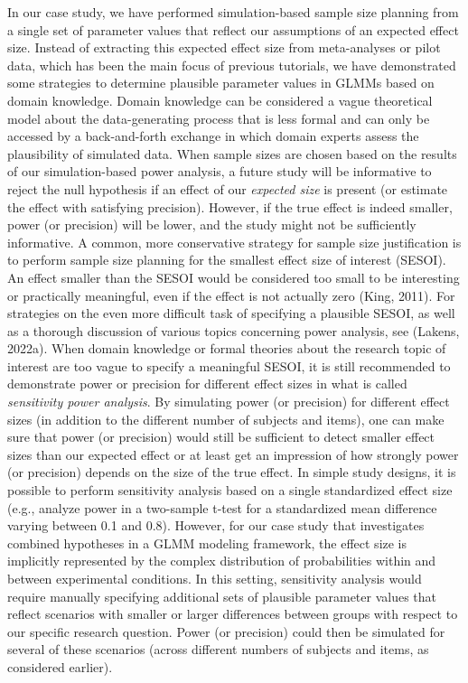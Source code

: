 \documentclass[
  man,floatsintext]{apa6}
\begin{document}
In our case study, we have performed simulation-based sample size planning from a single set of parameter values that reflect our assumptions of an expected effect size. Instead of extracting this expected effect size from meta-analyses or pilot data, which has been the main focus of previous tutorials, we have demonstrated some strategies to determine plausible parameter values in GLMMs based on domain knowledge. Domain knowledge can be considered a vague theoretical model about the data-generating process that is less formal and can only be accessed by a back-and-forth exchange in which domain experts assess the plausibility of simulated data. When sample sizes are chosen based on the results of our simulation-based power analysis, a future study will be informative to reject the null hypothesis if an effect of our \emph{expected size} is present (or estimate the effect with satisfying precision). However, if the true effect is indeed smaller, power (or precision) will be lower, and the study might not be sufficiently informative. A common, more conservative strategy for sample size justification is to perform sample size planning for the smallest effect size of interest (SESOI). An effect smaller than the SESOI would be considered too small to be interesting or practically meaningful, even if the effect is not actually zero (King, 2011). For strategies on the even more difficult task of specifying a plausible SESOI, as well as a thorough discussion of various topics concerning power analysis, see (Lakens, 2022a). When domain knowledge or formal theories about the research topic of interest are too vague to specify a meaningful SESOI, it is still recommended to demonstrate power or precision for different effect sizes in what is called \emph{sensitivity power analysis}. By simulating power (or precision) for different effect sizes (in addition to the different number of subjects and items), one can make sure that power (or precision) would still be sufficient to detect smaller effect sizes than our expected effect or at least get an impression of how strongly power (or precision) depends on the size of the true effect. In simple study designs, it is possible to perform sensitivity analysis based on a single standardized effect size (e.g., analyze power in a two-sample t-test for a standardized mean difference varying between 0.1 and 0.8). However, for our case study that investigates combined hypotheses in a GLMM modeling framework, the effect size is implicitly represented by the complex distribution of probabilities within and between experimental conditions. In this setting, sensitivity analysis would require manually specifying additional sets of plausible parameter values that reflect scenarios with smaller or larger differences between groups with respect to our specific research question. Power (or precision) could then be simulated for several of these scenarios (across different numbers of subjects and items, as considered earlier).
\end{document}
